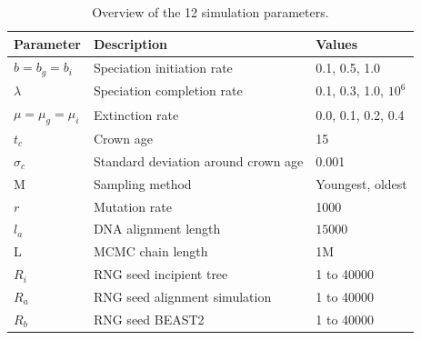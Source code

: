 \documentclass{article}
\begin{document}



\appendix

\begin{table}
  \centering 
  \begin{tabular}{l l l}
    \hline
    Parameter             & Description & Values \\
    \hline
    \hline
    $b = b_g = b_i$       & Speciation initiation rate & 0.1, 0.5, 1.0 \\
    $\lambda$             & Speciation completion rate & 0.1, 0.3, 1.0, $10^6$ \\
    $\mu = \mu_g = \mu_i$ & Extinction rate & 0.0, 0.1, 0.2, 0.4 \\
    $t_c$                 & Crown age & 15 \\
    $\sigma_c$            & Standard deviation around crown age & 0.001 \\
    M                     & Sampling method & Youngest, oldest \\
    $r$                   & Mutation rate & 1000 \\
    $l_a$                 & DNA alignment length & $15000$ \\
    L                     & MCMC chain length & 1M \\
    $R_i$                 & RNG seed incipient tree & 1 to 40000 \\
    $R_a$                 & RNG seed alignment simulation & 1 to 40000 \\
    $R_b$                 & RNG seed BEAST2 & 1 to 40000 \\
    \hline
  \end{tabular}
  \caption{
    Overview of the 12 simulation parameters.
  }
  \label{table:simulation_parameters}
\end{table}
\end{document}
